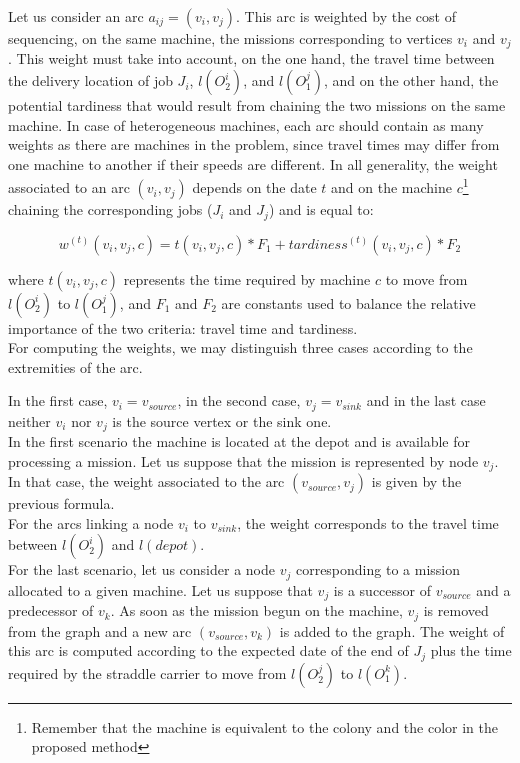 \documentclass[a4paper,10pt]{article}
\begin{document}
Let us consider an arc $a_{ij}=(v_i,v_j)$. This arc is weighted by the cost of sequencing, on the same machine, the missions corresponding to vertices $v_i$ and $v_j$. This weight must take into account, on the one hand, the travel time between the delivery location of job $J_i$, $l(O_2^i)$, and $l(O_1^j)$, and on the other hand, the potential tardiness that would result from chaining the two missions on the same machine. In case of heterogeneous machines, each arc should contain as many weights as there are machines in the problem, since travel times may differ from one machine to another if their speeds are different. In all generality, the weight associated to an arc $(v_i,v_j)$ depends on the date $t$ and on the machine $c$\footnote{Remember that the machine is equivalent to the colony and the color in the proposed method} chaining the corresponding jobs ($J_i$ and $J_j$) and is equal to:

\begin{equation*}
  w^{(t)}(v_i,v_j,c) = t(v_i,v_j,c)*F_1 + tardiness^{(t)}(v_i,v_j,c)*F_2
\end{equation*}

where $t(v_i,v_j,c)$ represents the time required by machine $c$ to move from $l(O_2^i)$ to $l(O_1^j)$, and $F_1$ and $F_2$ are constants used to balance the relative importance of the two criteria: travel time and tardiness.\\

For computing the weights, we may distinguish three cases according to the extremities of the arc.

In the first case, $v_i = v_{source}$, in the second case, $v_j = v_{sink}$ and in the last case neither $v_i$ nor $v_j$ is the source vertex or the sink one.\\

In the first scenario the machine is located at the depot  and is available for processing a mission. Let us suppose that the mission is represented by node $v_j$. In that case, the weight associated to the arc $(v_{source},v_j)$ is given by the previous formula.\\

For the arcs linking a node $v_i$ to $v_{sink}$, the weight corresponds to the travel time between $l(O_2^i)$ and $l(depot)$.\\

For the last scenario, let us consider a node $v_j$ corresponding to a mission allocated to a given machine. Let us suppose that $v_j$ is a successor of $v_{source}$ and a predecessor of $v_k$. As soon as the mission begun on the machine, $v_j$ is removed from the graph and a new arc $(v_{source},v_k)$ is added to the graph. The weight of this arc is computed according to the expected date of the end of $J_j$ plus the time required by the straddle carrier to move from $l(O_2^j)$ to $l(O_1^k)$. 
\end{document}
